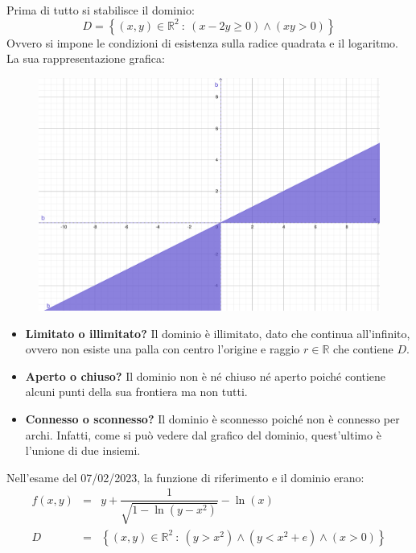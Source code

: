 \documentclass[a4paper]{article}
\begin{document}
	\noindent
	Prima di tutto si stabilisce il dominio:
	\begin{equation*}
		D = \left\{\left(x,y\right) \in \mathbb{R}^{2} \: : \: \left(x-2y \ge 0\right) \land \left(xy > 0\right)\right\}
	\end{equation*}
	Ovvero si impone le condizioni di esistenza sulla radice quadrata e il logaritmo. La sua rappresentazione grafica:
	\begin{figure}[!htp]
		\centering
		\includegraphics[width=\textwidth]{img/grafico-ex3-4.pdf}
	\end{figure}
	\begin{itemize}
		\item \textbf{Limitato o illimitato?} Il dominio è illimitato, dato che continua all'infinito, ovvero non esiste una palla con centro l'origine e raggio $r \in \mathbb{R}$ che contiene $D$.
		
		\item \textbf{Aperto o chiuso?} Il dominio non è né chiuso né aperto poiché contiene alcuni punti della sua frontiera ma non tutti.
		
		\item \textbf{Connesso o sconnesso?} Il dominio è sconnesso poiché non è connesso per archi. Infatti, come si può vedere dal grafico del dominio, quest'ultimo è l'unione di due insiemi.
	\end{itemize}
	Nell'esame del 07/02/2023, la funzione di riferimento e il dominio erano:
	\begin{equation*}
		\begin{array}{rcl}
			f\left(x,y\right) &=& y + \dfrac{1}{\sqrt{1 - \ln\left(y-x^{2}\right)}} - \ln\left(x\right) \\ [1.5em]
			D &=& \left\{\left(x,y\right) \in \mathbb{R}^{2} \: : \: \left(y > x^{2}\right) \land \left(y < x^{2} + e\right) \land \left(x > 0\right)\right\}
		\end{array}
	\end{equation*}
\end{document}
